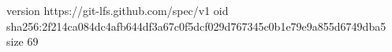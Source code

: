 version https://git-lfs.github.com/spec/v1
oid sha256:2f214ca084dc4afb644df3a67c0f5dcf029d767345c0b1e79e9a855d6749dba5
size 69
